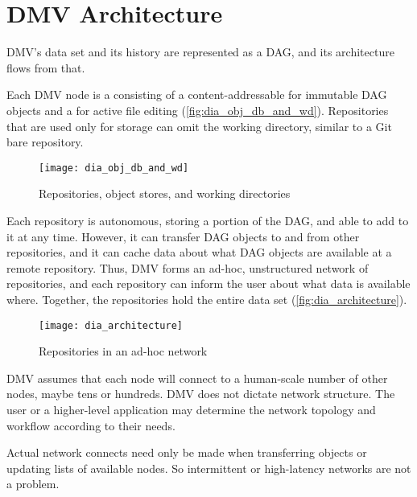 \chapter{DMV Architecture}

DMV's data set and its history are represented as a DAG, and its architecture
flows from that.

Each DMV node is a  consisting of a content-addressable
 for immutable DAG objects and a  for active file editing (\autoref{fig:dia_obj_db_and_wd}).
Repositories that are used only for storage can omit the working directory,
similar to a Git bare repository.

\begin{figure}[h]
  \caption{Repositories, object stores, and working directories}
  \label{fig:dia_obj_db_and_wd}
  \centering
    \texttt{[image: dia\_obj\_db\_and\_wd]}
\end{figure}

Each repository is autonomous, storing a portion of the DAG, and able to add to
it at any time. However, it can transfer DAG objects to and from other
repositories, and it can cache data about what DAG objects are available at a
remote repository. Thus, DMV forms an ad-hoc, unstructured network of
repositories, and each repository can inform the user about what data is
available where. Together, the repositories hold the entire data set
(\autoref{fig:dia_architecture}).

\begin{figure}[h]
  \caption{Repositories in an ad-hoc network}
  \label{fig:dia_architecture}
  \centering
    \texttt{[image: dia\_architecture]}
\end{figure}

DMV assumes that each node will connect to a human-scale number of other nodes,
maybe tens or hundreds. DMV does not dictate network structure. The user or a
higher-level application may determine the network topology and workflow
according to their needs.

Actual network connects need only be made when transferring objects or updating
lists of available nodes. So intermittent or high-latency networks are not a
problem.

